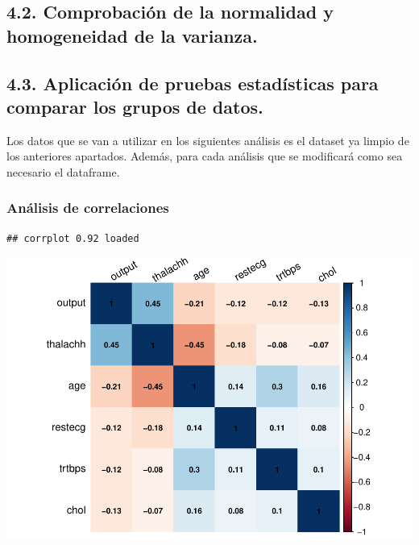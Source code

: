 \documentclass[
]{article}
\begin{document}
\hypertarget{comprobaciuxf3n-de-la-normalidad-y-homogeneidad-de-la-varianza.}{%
\subsection{4.2. Comprobación de la normalidad y homogeneidad de la
varianza.}\label{comprobaciuxf3n-de-la-normalidad-y-homogeneidad-de-la-varianza.}}

\hypertarget{aplicaciuxf3n-de-pruebas-estaduxedsticas-para-comparar-los-grupos-de-datos.}{%
\subsection{4.3. Aplicación de pruebas estadísticas para comparar los
grupos de
datos.}\label{aplicaciuxf3n-de-pruebas-estaduxedsticas-para-comparar-los-grupos-de-datos.}}

Los datos que se van a utilizar en los siguientes análisis es el dataset
ya limpio de los anteriores apartados. Además, para cada análisis que se
modificará como sea necesario el dataframe.

\hypertarget{anuxe1lisis-de-correlaciones}{%
\subsubsection{Análisis de
correlaciones}\label{anuxe1lisis-de-correlaciones}}

\begin{verbatim}
## corrplot 0.92 loaded
\end{verbatim}

\includegraphics{PRA2_files/figure-latex/unnamed-chunk-11-1.pdf}
\end{document}
